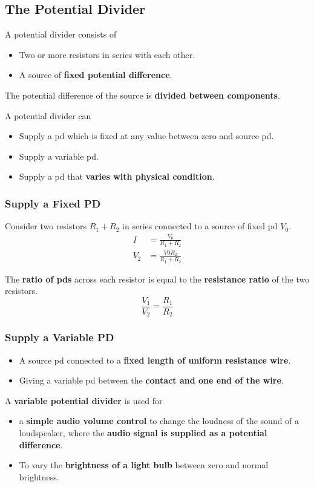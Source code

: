 \subsection{The Potential Divider}

A potential divider consists of
\begin{itemize}
    \item Two or more resistors in series with each other.
    \item A source of \textbf{fixed potential difference}.
\end{itemize}

The potential difference of the source is \textbf{divided between components}.

A potential divider can
\begin{itemize}
    \item Supply a pd which is fixed at any value between zero and source pd.
    \item Supply a variable pd.
    \item Supply a pd that \textbf{varies with physical condition}.
\end{itemize}

\subsubsection*{Supply a Fixed PD}

Consider two resistors $R_1+R_2$ in series connected to a source of fixed pd $V_0$.
\begin{align*}
    I&=\frac{V_0}{R_1+R_2}\\
    V_2&=\frac{V0R_2}{R_1+R_2}
\end{align*}

The \textbf{ratio of pds} across each resistor is equal to the \textbf{resistance ratio} of the two resistors.
$$\frac{V_1}{V_2}=\frac{R_1}{R_2}$$

\subsubsection*{Supply a Variable PD}
\begin{itemize}
    \item A source pd connected to a \textbf{fixed length of uniform resistance wire}.
    \item Giving a variable pd between the \textbf{contact and one end of the wire}.
\end{itemize}

A \textbf{variable potential divider} is used for
\begin{itemize}
    \item a \textbf{simple audio volume control} to change the loudness of the sound of a loudspeaker, where the \textbf{audio signal is supplied as a potential difference}.
    \item To vary the \textbf{brightness of a light bulb} between zero and normal brightness.
\end{itemize}


